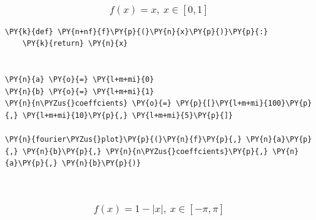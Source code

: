     \begin{center}
    \end{center}
    { \hspace*{\fill} \\}
    
    \hypertarget{fx-x-x-in-0-1}{%
\subsubsection{\texorpdfstring{\[f(x) = x,\ x \in [0, 1]\]}{f(x) = x,\textbackslash{} x \textbackslash in {[}0, 1{]}}}\label{fx-x-x-in-0-1}}

    \begin{tcolorbox}[breakable, size=fbox, boxrule=1pt, pad at break*=1mm,colback=cellbackground, colframe=cellborder]
\begin{Verbatim}[commandchars=\\\{\}]
\PY{k}{def} \PY{n+nf}{f}\PY{p}{(}\PY{n}{x}\PY{p}{)}\PY{p}{:}
    \PY{k}{return} \PY{n}{x}


\PY{n}{a} \PY{o}{=} \PY{l+m+mi}{0}
\PY{n}{b} \PY{o}{=} \PY{l+m+mi}{1}
\PY{n}{n\PYZus{}coeffcients} \PY{o}{=} \PY{p}{[}\PY{l+m+mi}{100}\PY{p}{,} \PY{l+m+mi}{10}\PY{p}{,} \PY{l+m+mi}{5}\PY{p}{]}

\PY{n}{fourier\PYZus{}plot}\PY{p}{(}\PY{n}{f}\PY{p}{,} \PY{n}{a}\PY{p}{,} \PY{n}{b}\PY{p}{,} \PY{n}{n\PYZus{}coeffcients}\PY{p}{,} \PY{n}{a}\PY{p}{,} \PY{n}{b}\PY{p}{)}
\end{Verbatim}
\end{tcolorbox}

    \begin{center}
    \end{center}
    { \hspace*{\fill} \\}
    
    \hypertarget{fx-1---x-x-in--pi-pi}{%
\subsubsection{\texorpdfstring{\[f(x) = 1 - |x|,\ x \in [-\pi, \pi]\]}{f(x) = 1 - \textbar x\textbar,\textbackslash{} x \textbackslash in {[}-\textbackslash pi, \textbackslash pi{]}}}\label{fx-1---x-x-in--pi-pi}}


